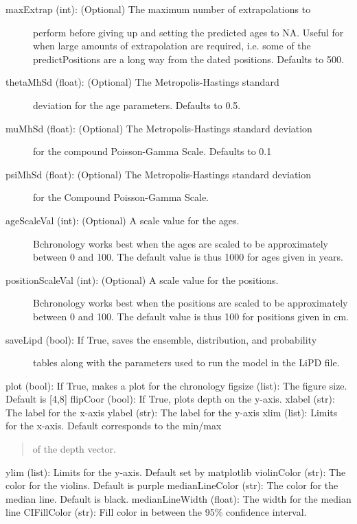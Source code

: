 \documentclass[letterpaper,10pt,english]{sphinxmanual}
\begin{document}
\begin{fulllineitems}
\begin{description}
\begin{description}
\item[{maxExtrap (int): (Optional) The maximum number of extrapolations to}] \leavevmode
perform before giving up and setting the predicted ages to NA. 
Useful for when large amounts of extrapolation are required, i.e.
some of the predictPositions are a long way from the dated
positions. Defaults to 500.

\item[{thetaMhSd (float):  (Optional)  The Metropolis-Hastings standard}] \leavevmode
deviation for the age parameters. Defaults to 0.5.

\item[{muMhSd (float): (Optional)  The Metropolis-Hastings standard deviation}] \leavevmode
for the compound Poisson-Gamma Scale. Defaults to 0.1

\item[{psiMhSd (float): (Optional) The Metropolis-Hastings standard deviation }] \leavevmode
for the Compound Poisson-Gamma Scale.

\item[{ageScaleVal (int): (Optional) A scale value for the ages. }] \leavevmode
Bchronology works best when the ages are scaled to be 
approximately between 0 and 100.
The default value is thus 1000 for ages given in years.

\item[{positionScaleVal (int):  (Optional) A scale value for the positions. }] \leavevmode
Bchronology works best when the positions are scaled to be 
approximately between 0 and 100. The default value is thus
100 for positions given in cm.

\item[{saveLipd (bool): If True, saves the ensemble, distribution, and probability}] \leavevmode
tables along with the parameters used to run the model in the LiPD
file.

\end{description}

plot (bool): If True, makes a plot for the chronology
figsize (list): The figure size. Default is {[}4,8{]}
flipCoor (bool): If True, plots depth on the y-axis.
xlabel (str): The label for the x-axis
ylabel (str): The label for the y-axis
xlim (list): Limits for the x-axis. Default corresponds to the min/max
\begin{quote}

of the depth vector.
\end{quote}

ylim (list): Limits for the y-axis. Default set by matplotlib
violinColor (str): The color for the violins. Default is purple
medianLineColor (str): The color for the median line. Default is black.
medianLineWidth (float): The width for the median line
CIFillColor (str): Fill color in between the 95\% confidence interval.
\begin{quote}


\end{quote}
\end{description}
\end{fulllineitems}
\end{document}
